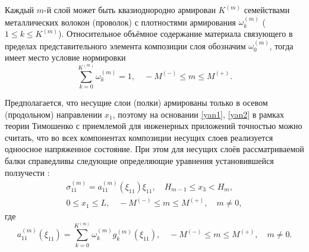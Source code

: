 Каждый $m$-й слой может быть квазиоднородно армирован $K^{(m)}$ семействами металлических волокон (проволок) с плотностями армирования $\omega_k^{(m)}$ ($1\le k\le K^{(m)}$). Относительное объёмное содержание материала связующего в пределах представительного элемента композиции слоя обозначим $\omega_0^{(m)}$, тогда имеет место условие нормировки
\begin{equation}
\label{yan8}
\sum\limits_{k=0}^{K^{(m)}}{\omega_k^{(m)}}=1,\quad -M^{(-)}\le m\le M^{(+)}.
\end{equation}

Предполагается, что несущие слои (полки) армированы только в осевом (продольном) направлении $x_1$, поэтому на основании \eqref{yan1}, \eqref{yan2} в рамках 
теории Тимошенко с приемлемой для инженерных приложений точностью можно считать, что во всех компонентах композиции несущих слоев реализуется одноосное напряженное состояние. При этом для несущих слоёв рассматриваемой балки справедливы следующие определяющие уравнения установившейся ползучести \cite{yan:bib4, yan:bib5, yan:bib9, yan:bib13}:
\begin{equation}
\label{yan9}
\begin{array}{c}
\sigma_{11}^{(m)}=a_{11}^{(m)}(\xi_{11})\xi_{11},\quad 
H_{m-1}\le x_3<H_m,\\
 0\le x_1\le L,\quad -M^{(-)}\le m\le M^{(+)},\quad m\ne0,
\end{array}
\end{equation}
где
\begin{equation}
\label{yan10}
a_{11}^{(m)}(\xi_{11})=\sum\limits_{k=0}^{K^{(m)}}{\omega_k^{(m)}g_k^{(m)}(\xi_{11})},\quad -M^{(-)}\le m\le M^{(+)},\quad m\ne0.
\end{equation}

